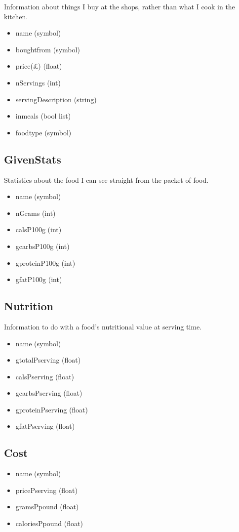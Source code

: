 \documentclass[a4paper]{article}
\begin{document}
Information about things I buy at the shops, rather than what I cook in the 
kitchen.

\begin{itemize}
  \item name (symbol)
  \item boughtfrom (symbol)
  \item price(£) (float)
  \item nServings (int)
  \item servingDescription (string)
  \item inmeals (bool list)
  \item foodtype (symbol)
\end{itemize}

\subsection{GivenStats}

Statistics about the food I can see straight from the packet of food.

\begin{itemize}
  \item name (symbol)
  \item nGrams (int)
  \item calsP100g (int)
  \item gcarbsP100g (int)
  \item gproteinP100g (int)
  \item gfatP100g (int)
\end{itemize} 
  
\subsection{Nutrition}

Information to do with a food's nutritional value at serving time.

\begin{itemize}
  \item name (symbol)
  \item gtotalPserving (float)
  \item calsPserving (float)
  \item gcarbsPserving (float)
  \item gproteinPserving (float)
  \item gfatPserving (float)
\end{itemize}

\subsection{Cost}

\begin{itemize}
  \item name (symbol)
  \item pricePserving (float)
  \item gramsPpound (float)
  \item caloriesPpound (float)
\end{itemize}
\end{document}
